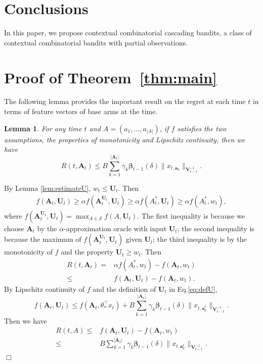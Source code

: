 \documentclass{article}
\newcommand{\bbeta}{\boldsymbol{\beta}}
\newcommand{\bA}{\mathbf{A}}
\newcommand{\ba}{\mathbf{a}}
\newcommand{\bU}{\mathbf{U}}
\newcommand{\bV}{\mathbf{V}}
\newcommand{\cS}{\mathcal{S}}
\newcommand{\abs}[1]{\left| #1 \right|}
\newcommand{\norm}[1]{\| #1 \|}
\newtheorem{lemma}[theorem]{Lemma}%
\newenvironment{proof}{\noindent {\textbf{Proof. }}}{$\Box$ \medskip}
\begin{document}
\section{Conclusions}

In this paper, we propose contextual combinatorial cascading bandits, a class of contextual combinatorial bandits with partial observations. 


	



\appendix

\section{Proof of Theorem~\ref{thm:main}}

The following lemma provides the important result on the regret at each time $t$ in terms of feature vectors of base arms at the time.

\begin{lemma} %
	\label{lem:DeltaEstimate}
	For any time $t$ and $A = (a_1, \ldots, a_{\abs{A}})$, if $f$ satisfies the two assumptions, the properties of monotonicity and Lipschitz continuity, 
	then we have
	$$
		R(t, \bA_t) \leq B \sum_{k=1}^{\abs{\bA_t}} \gamma_k \bbeta_{t-1}(\delta)\norm{x_{t, \ba_k}}_{\bV_{t-1}^{-1}}.
	$$
\end{lemma}
\begin{proof}
	By Lemma \ref{lem:estimateU}, $w_t \leq \bU_t$. Then
	\begin{align*}
		f(\bA_t, \bU_t) \geq \alpha f(\bA_t^{\bU_t}, \bU_t) \geq \alpha f(A_t^*, \bU_t) \geq \alpha f(A_t^*, w_t),
	\end{align*}
	where $f(\bA_t^{\bU_t}, \bU_t) = \max_{A \in \cS} f(A, \bU_t)$. The first inequality is because we choose $\bA_t$ by the $\alpha$-approximation oracle with input $\bU_t$; the second inequality is because the maximum of $f(\bA_t^{\bU_t}, \bU_t)$ given $\bU_t$; the third inequality is by the monotonicity of $f$ and the property $\bU_t \geq w_t$. Then
	\begin{align*}
		R(t, \bA_t) = &\alpha f(A_t^*, w_t) - f(\bA_t, w_t) \\
		\leq &f(\bA_t, \bU_t) - f(\bA_t, w_t).
	\end{align*}
	By Lipschitz continuity of $f$ and the definition of $\bU_t$ in Eq.\eqref{eq:defU},
	$$
	f(\bA_t, \bU_t) \leq f(\bA_t, \theta_{\ast}^{\top}x_t) + B \sum_{k=1}^{\abs{\bA_t}} \gamma_k \bbeta_{t-1}(\delta)\norm{x_{t, \ba_k^t}}_{\bV_{t-1}^{-1}}.
	$$
	Then we have
	\begin{align*}
		R(t, A) \leq &f(\bA_t, \bU_t) - f(\bA_t, w_t) \\
		\leq &B \sum_{k=1}^{\abs{\bA_t}} \gamma_k \bbeta_{t-1}(\delta)\norm{x_{t, \ba_k^t}}_{\bV_{t-1}^{-1}}.
	\end{align*}
\end{proof}
\end{document}
